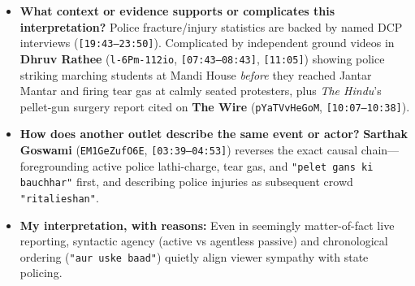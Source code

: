 \documentclass[10pt,a4paper]{article}
\begin{document}
\begin{itemize}[leftmargin=1.5em, itemsep=3pt, topsep=4pt]
  \item \textbf{What context or evidence supports or complicates this interpretation?} Police fracture/injury statistics are backed by named DCP interviews (\texttt{[19:43--23:50]}). Complicated by independent ground videos in \textbf{Dhruv Rathee} (\texttt{l-6Pm-112io}, \texttt{[07:43--08:43]}, \texttt{[11:05]}) showing police striking marching students at Mandi House \textit{before} they reached Jantar Mantar and firing tear gas at calmly seated protesters, plus \textit{The Hindu}'s pellet-gun surgery report cited on \textbf{The Wire} (\texttt{pYaTVvHeGoM}, \texttt{[10:07--10:38]}).
  \item \textbf{How does another outlet describe the same event or actor?} \textbf{Sarthak Goswami} (\texttt{EM1GeZufO6E}, \texttt{[03:39--04:53]}) reverses the exact causal chain---foregrounding active police lathi-charge, tear gas, and \texttt{"pelet gans ki bauchhar"} first, and describing police injuries as subsequent crowd \texttt{"ritalieshan"}.
  \item \textbf{My interpretation, with reasons:} Even in seemingly matter-of-fact live reporting, syntactic agency (active vs agentless passive) and chronological ordering (\texttt{"aur uske baad"}) quietly align viewer sympathy with state policing.
\end{itemize}
\end{document}
